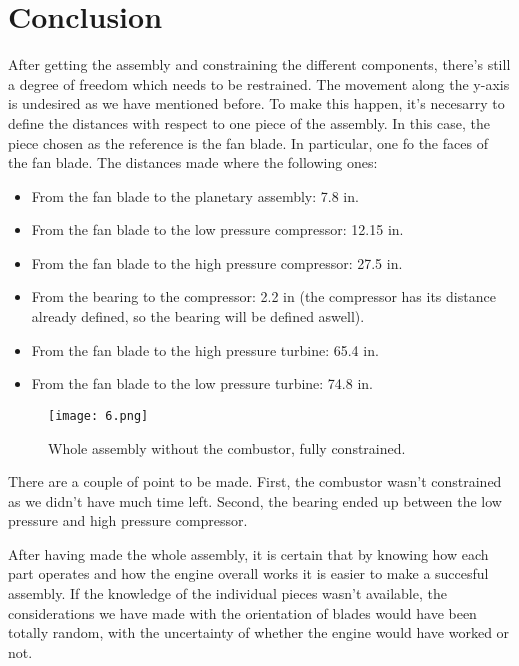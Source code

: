 \documentclass[12pt, letterpaper]{article}
\begin{document}
\section*{Conclusion}

After getting the assembly and constraining the different components, there's still a degree of freedom which needs to be restrained. The movement along the y-axis is undesired as we have mentioned before. To make this happen, it's necesarry to define the distances with respect to one piece of the assembly. In this case, the piece chosen as the reference is the fan blade. In particular, one fo the faces of the fan blade. The distances made where the following ones:

\begin{itemize}
	\item From the fan blade to the planetary assembly: 7.8 in.
	\item From the fan blade to the low pressure compressor: 12.15 in.
	\item From the fan blade to the high pressure compressor: 27.5 in.
	\item From the bearing to the compressor: 2.2 in (the compressor has its distance already defined, so the bearing will be defined aswell).
	\item From the fan blade to the high pressure turbine: 65.4 in.
	\item From the fan blade to the low pressure turbine: 74.8 in.
\end{itemize}

\begin{figure}[H]
	\centering
	\texttt{[image: 6.png]}
	\caption{Whole assembly without the combustor, fully constrained.}
\end{figure}

There are a couple of point to be made. First, the combustor wasn't constrained as we didn't have much time left. Second, the bearing ended up between the low pressure and high pressure compressor.

After having made the whole assembly, it is certain that by knowing how each part operates and how the engine overall works it is easier to make a succesful assembly. If the knowledge of the individual pieces wasn't available, the considerations we have made with the orientation of blades would have been totally random, with the uncertainty of whether the engine would have worked or not.
\end{document}
